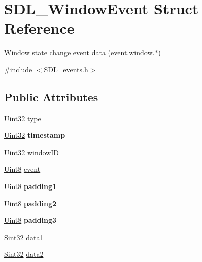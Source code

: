\hypertarget{struct_s_d_l___window_event}{}\section{S\+D\+L\+\_\+\+Window\+Event Struct Reference}
\label{struct_s_d_l___window_event}


Window state change event data (\hyperlink{union_s_d_l___event_a826936b3275406d857bc6654669fae71}{event.\+window}.$\ast$)  




{\ttfamily \#include $<$S\+D\+L\+\_\+events.\+h$>$}

\subsection*{Public Attributes}
\begin{DoxyCompactItemize}
\item 
\hyperlink{_s_d_l__stdinc_8h_add440eff171ea5f55cb00c4a9ab8672d}{Uint32} \hyperlink{struct_s_d_l___window_event_a01c8c8fbe8564e690f958d2db560f657}{type}
\item 
\hypertarget{struct_s_d_l___window_event_a7b0bf569b20cfa4e3fb76e3301d616f9}{}\hyperlink{_s_d_l__stdinc_8h_add440eff171ea5f55cb00c4a9ab8672d}{Uint32} {\bfseries timestamp}\label{struct_s_d_l___window_event_a7b0bf569b20cfa4e3fb76e3301d616f9}

\item 
\hyperlink{_s_d_l__stdinc_8h_add440eff171ea5f55cb00c4a9ab8672d}{Uint32} \hyperlink{struct_s_d_l___window_event_a4b31796ffc84fbb7f6e9ba33e127619a}{window\+I\+D}
\item 
\hyperlink{_s_d_l__stdinc_8h_a2944638813a090aa23e62f4da842c3e2}{Uint8} \hyperlink{struct_s_d_l___window_event_a485cd1f07f0f22fdb9f4c4bf214011dc}{event}
\item 
\hypertarget{struct_s_d_l___window_event_a09ee59114246eceed4a281033ec6609b}{}\hyperlink{_s_d_l__stdinc_8h_a2944638813a090aa23e62f4da842c3e2}{Uint8} {\bfseries padding1}\label{struct_s_d_l___window_event_a09ee59114246eceed4a281033ec6609b}

\item 
\hypertarget{struct_s_d_l___window_event_a6bcf773b690b894e8c04c591826d0c8a}{}\hyperlink{_s_d_l__stdinc_8h_a2944638813a090aa23e62f4da842c3e2}{Uint8} {\bfseries padding2}\label{struct_s_d_l___window_event_a6bcf773b690b894e8c04c591826d0c8a}

\item 
\hypertarget{struct_s_d_l___window_event_ac352263b5fa4ba6dbd64a48062d5e29f}{}\hyperlink{_s_d_l__stdinc_8h_a2944638813a090aa23e62f4da842c3e2}{Uint8} {\bfseries padding3}\label{struct_s_d_l___window_event_ac352263b5fa4ba6dbd64a48062d5e29f}

\item 
\hyperlink{_s_d_l__stdinc_8h_a7a90b941db9d4582e9ad7abb9940ff7e}{Sint32} \hyperlink{struct_s_d_l___window_event_a01da0025428d3434c80021f3e4089fec}{data1}
\item 
\hyperlink{_s_d_l__stdinc_8h_a7a90b941db9d4582e9ad7abb9940ff7e}{Sint32} \hyperlink{struct_s_d_l___window_event_af6cd0a21bc9ecadfee42f6a0147d7171}{data2}
\end{DoxyCompactItemize}



